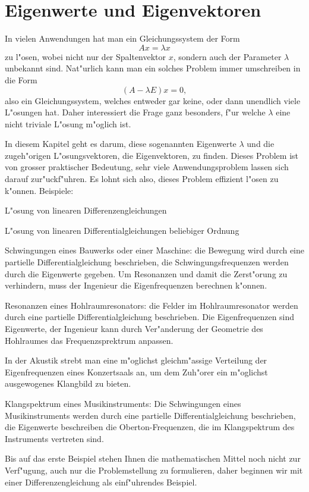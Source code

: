 \chapter{Eigenwerte und Eigenvektoren\label{chapter-eigen}}
In vielen Anwendungen hat man ein Gleichungssystem der Form
\[
Ax=\lambda x
\]
zu l"osen, wobei nicht nur der Spaltenvektor $x$, sondern auch der
Parameter $\lambda$ unbekannt sind. Nat"urlich kann man ein solches
Problem immer umschreiben in die Form
\[
(A-\lambda E) x=0,
\]
also ein Gleichungssystem, welches entweder gar keine, oder dann
unendlich viele L"osungen hat. Daher interessiert die Frage 
ganz besonders, f"ur welche $\lambda$ eine nicht triviale L"osung m"oglich ist.

In diesem Kapitel geht es darum, diese sogenannten Eigenwerte $\lambda$
und die zugeh"origen L"osungsvektoren, die Eigenvektoren, zu finden. Dieses
Problem ist von grosser praktischer Bedeutung, sehr viele Anwendungsproblem
lassen sich darauf zur"uckf"uhren. Es lohnt sich also, dieses Problem
effizient l"osen zu k"onnen. Beispiele:
\begin{compactitem}
\item L"osung von linearen Differenzengleichungen
\item L"osung von linearen Differentialgleichungen beliebiger Ordnung
\item Schwingungen eines Bauwerks oder einer Maschine: die Bewegung wird durch
eine partielle Differentialgleichung beschrieben, die Schwingungsfrequenzen
werden durch die Eigenwerte gegeben. Um Resonanzen und damit die Zerst"orung
zu verhindern, muss der Ingenieur die Eigenfrequenzen
berechnen k"onnen.
\item Resonanzen eines Hohlraumresonators: die Felder im Hohlraumresonator
werden durch eine partielle Differentialgleichung beschrieben.
Die Eigenfrequenzen sind Eigenwerte, der Ingenieur kann durch Ver"anderung
der Geometrie des Hohlraumes das Frequenzsprektrum anpassen.
\item
{}
In der
Akustik strebt man eine m"oglichst gleichm"assige Verteilung der Eigenfrequenzen
eines Konzertsaals an, um dem Zuh"orer ein m"oglichst ausgewogenes Klangbild
zu bieten.
\item Klangspektrum eines Musikinstruments: Die Schwingungen eines Musikinstruments
werden durch eine partielle Differentialgleichung beschrieben, die
Eigenwerte beschreiben die Oberton-Frequenzen, die im Klangspektrum des
Instruments vertreten sind.
\end{compactitem}
Bis auf das erste Beispiel stehen Ihnen die mathematischen Mittel noch nicht
zur Verf"ugung, auch nur die Problemstellung zu formulieren, daher beginnen
wir mit einer Differenzengleichung als einf"uhrendes Beispiel.

